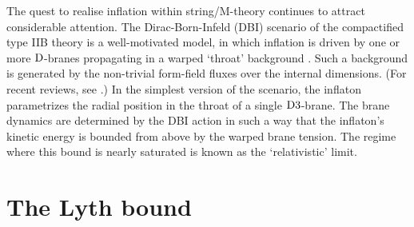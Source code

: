 The quest to realise inflation within string/M-theory continues to 
attract considerable attention. The Dirac-Born-Infeld (DBI) scenario 
of the compactified type IIB theory is a well-motivated model, 
in which inflation is driven by one or more ${\rm D}$-branes 
propagating in a warped `throat' background
\cite{brane1,brane11,brane12,brane13, brane2,brane20,brane3, brane4,brane5,brane6}
. Such a background is generated 
by the non-trivial form-field fluxes over the internal dimensions. 
(For recent reviews, see
\cite{tyereview,McAllister:2007bg,Lorenz:2007ze,Kallosh:2007wm,Bean:2007eh,bean,
cline}.) 
In the simplest version of the scenario, 
the inflaton parametrizes the radial 
position in the throat of a single ${\rm D3}$-brane. 
The brane dynamics are determined by the DBI action in such a 
way that the inflaton's kinetic energy is bounded from above by the warped 
brane tension. The regime where this bound is nearly saturated is 
known as the `relativistic' limit.



\section{The Lyth bound}
\label{sec:lyth-dbiintro}

